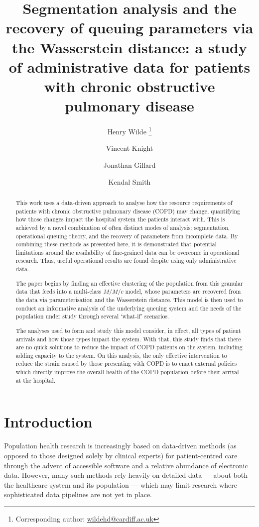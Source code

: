 \documentclass[11pt]{article}
\title{%
    Segmentation analysis and the recovery of queuing parameters via the
    Wasserstein distance: a study of administrative data for patients with
    chronic obstructive pulmonary disease
}
\author[a]{%
    Henry Wilde \footnote{Corresponding author: \url{wildehd@cardiff.ac.uk}}%
}
\author[a]{Vincent Knight}
\author[a]{Jonathan Gillard}
\author[b]{Kendal Smith}
\affil[a]{School of Mathematics, Cardiff University}
\affil[b]{Cwm Taf Morgannwg University Health Board}
\date{}
\begin{document}
\maketitle%

\begin{abstract}
    This work uses a data-driven approach to analyse how the resource
    requirements of patients with chronic obstructive pulmonary disease (COPD)
    may change, quantifying how those changes impact the hospital system the
    patients interact with. This is achieved by a novel combination of often
    distinct modes of analysis: segmentation, operational queuing theory, and
    the recovery of parameters from incomplete data. By combining these methods
    as presented here, it is demonstrated that potential limitations around the
    availability of fine-grained data can be overcome in operational research.
    Thus, useful operational results are found despite using only administrative
    data.

    The paper begins by finding an effective clustering of the population from
    this granular data that feeds into a multi-class \(M/M/c\) model, whose
    parameters are recovered from the data via parameterisation and the
    Wasserstein distance. This model is then used to conduct an informative
    analysis of the underlying queuing system and the needs of the population
    under study through several `what-if' scenarios.

    The analyses used to form and study this model consider, in effect, all
    types of patient arrivals and how those types impact the system.  With that,
    this study finds that there are no quick solutions to reduce the impact of
    COPD patients on the system, including adding capacity to the system. On
    this analysis, the only effective intervention to reduce the strain caused
    by those presenting with COPD is to enact external policies which directly
    improve the overall health of the COPD population before their arrival at
    the hospital.
\end{abstract}

\section{Introduction}\label{sec:intro}

Population health research is increasingly based on data-driven methods (as
opposed to those designed solely by clinical experts) for patient-centred care
through the advent of accessible software and a relative abundance of electronic
data. However, many such methods rely heavily on detailed data --- about both
the healthcare system and its population --- which may limit research where
sophisticated data pipelines are not yet in place.
\end{document}
